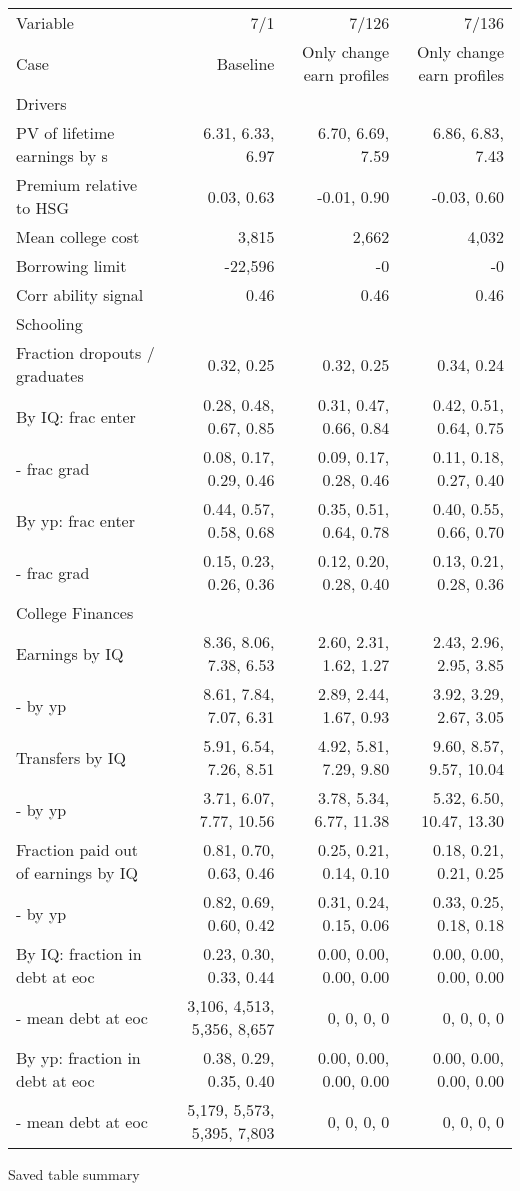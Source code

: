 \begin{tabular}{lrrr}
\hline
Variable & 7/1  & 7/126  & 7/136  \\
Case & Baseline  & Only change earn profiles  & Only change earn profiles  \\
Drivers &   &   &   \\
PV of lifetime earnings by s & 6.31, 6.33, 6.97  & 6.70, 6.69, 7.59  & 6.86, 6.83, 7.43  \\
Premium relative to HSG & 0.03, 0.63  & -0.01, 0.90  & -0.03, 0.60  \\
Mean college cost & 3,815  & 2,662  & 4,032  \\
Borrowing limit & -22,596  & -0  & -0  \\
Corr ability signal & 0.46  & 0.46  & 0.46  \\
\hline
Schooling &   &   &   \\
Fraction dropouts / graduates & 0.32, 0.25  & 0.32, 0.25  & 0.34, 0.24  \\
By IQ: frac enter & 0.28, 0.48, 0.67, 0.85  & 0.31, 0.47, 0.66, 0.84  & 0.42, 0.51, 0.64, 0.75  \\
- frac grad & 0.08, 0.17, 0.29, 0.46  & 0.09, 0.17, 0.28, 0.46  & 0.11, 0.18, 0.27, 0.40  \\
By yp: frac enter & 0.44, 0.57, 0.58, 0.68  & 0.35, 0.51, 0.64, 0.78  & 0.40, 0.55, 0.66, 0.70  \\
- frac grad & 0.15, 0.23, 0.26, 0.36  & 0.12, 0.20, 0.28, 0.40  & 0.13, 0.21, 0.28, 0.36  \\
\hline
College Finances &   &   &   \\
Earnings by IQ & 8.36, 8.06, 7.38, 6.53  & 2.60, 2.31, 1.62, 1.27  & 2.43, 2.96, 2.95, 3.85  \\
- by yp & 8.61, 7.84, 7.07, 6.31  & 2.89, 2.44, 1.67, 0.93  & 3.92, 3.29, 2.67, 3.05  \\
Transfers by IQ & 5.91, 6.54, 7.26, 8.51  & 4.92, 5.81, 7.29, 9.80  & 9.60, 8.57, 9.57, 10.04  \\
- by yp & 3.71, 6.07, 7.77, 10.56  & 3.78, 5.34, 6.77, 11.38  & 5.32, 6.50, 10.47, 13.30  \\
Fraction paid out of earnings by IQ & 0.81, 0.70, 0.63, 0.46  & 0.25, 0.21, 0.14, 0.10  & 0.18, 0.21, 0.21, 0.25  \\
- by yp & 0.82, 0.69, 0.60, 0.42  & 0.31, 0.24, 0.15, 0.06  & 0.33, 0.25, 0.18, 0.18  \\
By IQ: fraction in debt at eoc & 0.23, 0.30, 0.33, 0.44  & 0.00, 0.00, 0.00, 0.00  & 0.00, 0.00, 0.00, 0.00  \\
- mean debt at eoc & 3,106, 4,513, 5,356, 8,657  & 0, 0, 0, 0  & 0, 0, 0, 0  \\
By yp: fraction in debt at eoc & 0.38, 0.29, 0.35, 0.40  & 0.00, 0.00, 0.00, 0.00  & 0.00, 0.00, 0.00, 0.00  \\
- mean debt at eoc & 5,179, 5,573, 5,395, 7,803  & 0, 0, 0, 0  & 0, 0, 0, 0  \\
\hline
\end{tabular}%
Saved table summary

